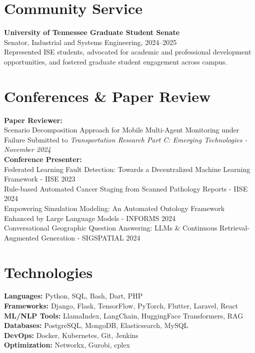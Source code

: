 \documentclass[10pt, letterpaper]{article}
\begin{document}
\vspace{0.3cm}






\section*{Community Service}

\textbf{University of Tennessee Graduate Student Senate} \\  
Senator, Industrial and Systems Engineering, 2024–2025 \\  
Represented ISE students, advocated for academic and professional development opportunities, and fostered graduate student engagement across campus.



\section*{Conferences \& Paper Review}
\textbf{Paper Reviewer:}\\
Scenario Decomposition Approach for Mobile Multi-Agent Monitoring under Failure
Submitted to \textit{Transportation Research Part C: Emerging Technologies - November 2024} \\


\textbf{Conference Presenter:}\\
Federated Learning Fault Detection: Towards a Decentralized Machine Learning Framework - IISE 2023\\
Rule-based Automated Cancer Staging from Scanned Pathology Reports - IISE 2024\\
Empowering Simulation Modeling: An Automated Ontology Framework Enhanced by Large Language Models - INFORMS 2024\\
Conversational Geographic Question Answering: LLMs \& Continuous Retrieval-Augmented Generation - SIGSPATIAL 2024\\


\section*{Technologies}
\begin{multicols}{2}
    \textbf{Languages:} Python, SQL, Bash, Dart, PHP \\
    \textbf{Frameworks:} Django, Flask, TensorFlow, PyTorch, Flutter, Laravel, React \\
    \textbf{ML/NLP Tools:} LlamaIndex, LangChain, HuggingFace Transformers, RAG \\
    \textbf{Databases:} PostgreSQL, MongoDB, Elasticsearch, MySQL \\
    \textbf{DevOps:} Docker, Kubernetes, Git, Jenkins \\
    \textbf{Optimization:} Networkx, Gurobi, cplex
\end{multicols}

    
\end{document}
